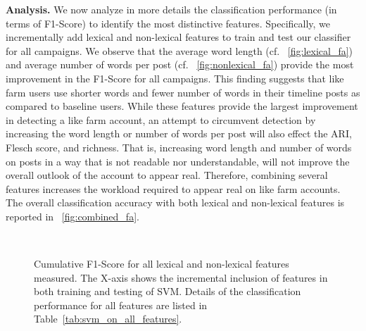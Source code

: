 \documentclass[twocolumn,10pt,letterpaper]{article}
\newcommand{\descr}[1]{\smallskip\noindent\textbf{#1}}
\begin{document}
\descr{Analysis.}
We now analyze in more details the classification performance (in terms of F1-Score) to identify the most distinctive features. Specifically, we incrementally add lexical and non-lexical features to train and test our classifier for all campaigns. We observe that the average word length (cf. \figurename~\ref{fig:lexical_fa}) and average number of words per post (cf. \figurename~\ref{fig:nonlexical_fa}) provide the most improvement in the F1-Score for all campaigns. This finding suggests that like farm users use shorter words and fewer number of words in their timeline posts as compared to baseline users. While these features provide the largest improvement in detecting a like farm account, an attempt to circumvent detection by increasing the word length or number of words per post will also effect the ARI, Flesch score, and richness. That is, increasing word length and number of words on posts in a way that is not readable nor understandable, will not improve the overall outlook of the account to appear real. Therefore, combining several features increases the workload required to appear real on like farm accounts. %
The overall classification accuracy with both lexical and non-lexical features is reported in \figurename~\ref{fig:combined_fa}.


\begin{figure*}[!t]
	\centering
{}
%
\\
%
%
\vspace{-0.2cm}
\caption{Cumulative F1-Score for all lexical and non-lexical features measured. The X-axis shows the incremental inclusion of features in both training and testing of SVM. Details of the classification performance for all features are listed in Table~\ref{tab:svm_on_all_features}. }%
\label{fig:factoranalysis}
\vspace{0.3cm}
\end{figure*}

%
%
\end{document}
